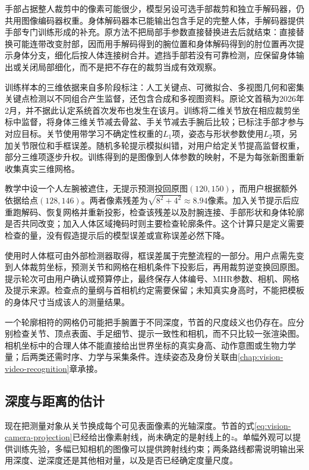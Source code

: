 手部占据整人裁剪中的像素可能很少，模型另设可选手部裁剪和独立手解码器，仍共用图像编码器权重。身体解码器本已能输出包含手足的完整人体，手解码器提供手部专门训练形成的补充。原方法不把局部手参数直接替换进去后就结束：直接替换可能连带改变肘部，因而用手解码得到的腕位置和身体解码得到的肘位置再次提示身体分支，细化后按人体连接树合并。遮挡手部若没有可靠检测，应保留身体输出或关闭局部细化，而不是把不存在的裁剪当成有效观察。

训练样本的三维依据来自多阶段标注：人工关键点、可微拟合、多视图几何和密集关键点检测以不同组合产生监督，还包含合成和多视图资料。原论文首稿为2026年2月，并不据此认定系统首次发布也发生在该月。训练将二维关节放在相应裁剪坐标中监督，将身体三维关节减去骨盆、手关节减去手腕后比较；已标注手部才参与对应目标。关节使用带学习不确定性权重的$L_1$项，姿态与形状参数使用$L_2$项，另加关节限位和手框误差。随机多轮提示模拟纠错，对用户给定关节提高监督权重，部分三维项逐步升权。训练得到的是图像到人体参数的映射，不是为每张新图重新收集真实三维网格。

教学中设一个人左腕被遮住，无提示预测投回原图$(120,150)$，而用户根据额外依据给点$(128,146)$。两者像素残差为$\sqrt{8^2+4^2}\approx8.94$像素。加入关节提示后应重跑解码、恢复网格并重新投影，检查该残差以及肘腕连接、手部形状和身体轮廓是否共同改变；加入人体区域掩码时则主要检查轮廓条件。这个计算只是定义需要检查的量，没有假造提示后的模型误差或宣称误差必然下降。

使用时人体框可由外部检测器取得，框误差属于完整流程的一部分。用户点需先变到人体裁剪坐标，预测关节和网格在相机条件下投影后，再用裁剪逆变换回原图。提示轮次可由用户确认或预算停止，最终保存人体编号、MHR参数、相机、网格及提示来源。检查点的量纲与首相机约定需要保留；未知真实身高时，不能把模板的身体尺寸当成该人的测量结果。

一个轮廓相符的网格仍可能把手腕置于不同深度，节首的尺度歧义也仍存在。应分别检查关节、顶点表面、手足细节、提示一致性和相机，而不只比较一张渲染图。相机坐标中的合理人体不能直接给出世界坐标的真实身高、动作意图或生物力学量；后两类还需时序、力学与采集条件。连续姿态及身份关联由\ref{chap:vision-video-recognition}章承接。

\subsection{深度与距离的估计}
\label{sec:vision-recognition-depth}

现在把测量对象从关节换成每个可见表面像素的光轴深度。节首的式\eqref{eq:vision-camera-projection}已经给出像素射线，尚未确定的是射线上的$z$。单幅外观可以提供训练先验，多幅已知相机的图像可以提供跨射线约束；两条路线都需说明输出采用深度、逆深度还是其他相对量，以及是否已经确定度量尺度。

